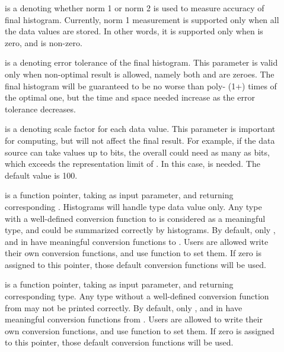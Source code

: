\begin{description}
\item[] is a  denoting whether norm 1 or norm 2
  is used to measure accuracy of final histogram. Currently, norm 1
  measurement is supported only when all the data values are
  stored. In other words, it is supported only when  is
  zero, and  is non-zero. 

\item[] is a  denoting error tolerance of the
  final histogram. This parameter is valid only when non-optimal
  result is allowed, namely both  and  are
  zeroes. The final histogram will be guaranteed to be no worse than
  poly- (1+) times of the optimal one, but the time and
  space needed increase as the error tolerance decreases.  

\item[] is a  denoting scale factor for
  each data value. This parameter is important for computing, but will
  not affect the final result. For example, if the data source can
  take values up to  bits, the overall  could need
  as many as  bits, which exceeds the representation limit of
  \pads{}. In this case,  is needed. The default value
  is 100.       

\item[] is a function pointer, taking
   as input parameter, and returning corresponding
  . Histograms will handle  type data value 
  only. Any type with a well-defined conversion function to
   is considered as a meaningful type, and could be summarized
  correctly by histograms. By default, only ,  and  in \pads{} have
  meaningful conversion functions to . Users are allowed write their
  own conversion functions, and use  function
  to set them. If zero is assigned to this pointer, those default
  conversion functions will be used.
   
\item[] is a function pointer, taking
   as input parameter, and returning corresponding
   type. Any type without a well-defined conversion
  function from  may not be printed correctly. By
  default, only ,  and  in \pads{} have
  meaningful conversion functions from . Users are allowed to write their
  own conversion functions, and use  function
  to set them. If zero is assigned to this pointer, those default
  conversion functions will be used.

\end{description}
